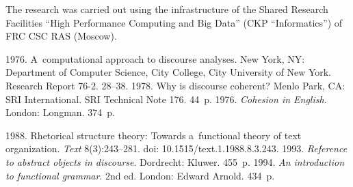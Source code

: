 
\vspace*{-16pt}

\Ack

\vspace*{-3pt}

\noindent
The research was carried out using the infrastructure of the Shared Research Facilities ``High 
Performance Computing and Big Data'' (CKP ``Informatics'') of FRC CSC RAS (Moscow).


\vspace*{6pt}

  \begin{multicols}{2}

\renewcommand{\bibname}{\protect\rmfamily References}

{\small\frenchspacing
 {%
 \begin{thebibliography}{99}
 1976. A~computational approach to discourse analyses. New York, NY: 
Department of Computer Science, City College, City University of New York. Research Report  
76-2. 28--38.
 1978. Why is discourse coherent? Menlo Park, CA: SRI International. SRI 
Technical Note 176. 44~p.
 1976. \textit{Cohesion in English}. London: Longman. 
374~p.


 1988. Rhetorical structure theory: Towards 
a~functional theory of text organization. \textit{Text} 8(3):243--281. doi: 
10.1515/text.1.1988.8.3.243.
 1993. \textit{Reference to abstract objects in discourse}. Dordrecht: Kluwer. 
455~p.
 1994. \textit{An introduction to functional grammar}. 2nd ed. London: 
Edward Arnold. 434~p.


\end{thebibliography}}}
\end{multicols}

